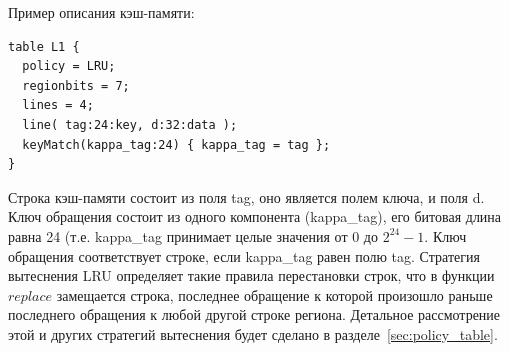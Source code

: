 Пример описания кэш-памяти:
\begin{verbatim}
table L1 {
  policy = LRU;
  regionbits = 7;
  lines = 4;
  line( tag:24:key, d:32:data );
  keyMatch(kappa_tag:24) { kappa_tag = tag };
}
\end{verbatim}

Строка кэш-памяти состоит из поля tag, оно является полем ключа, и поля d. Ключ обращения состоит из одного компонента (kappa\_tag), его битовая длина равна 24 (т.е. kappa\_tag принимает целые значения от 0 до $2^{24}{-}1$. Ключ обращения соответствует строке, если kappa\_tag равен полю tag. Стратегия вытеснения LRU определяет такие правила перестановки строк, что в функции $replace$ замещается строка, последнее обращение к которой произошло раньше последнего обращения к любой другой строке региона. Детальное рассмотрение этой и других стратегий вытеснения будет сделано в разделе~\ref{sec:policy_table}.


%
%

